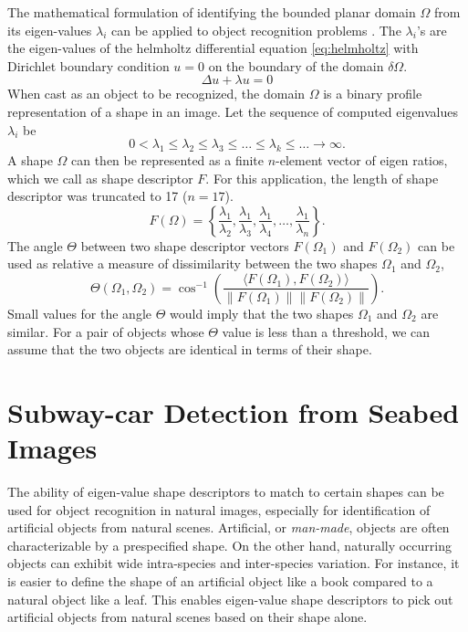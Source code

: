\documentclass {udthesis}
\begin{document}
The mathematical formulation of identifying the bounded planar domain $\Omega$ from its eigen-values $\lambda_{i}$ can be applied to object recognition problems \cite{khabou, zuliani}. The $\lambda_{i}$'s are the eigen-values of the helmholtz differential equation \eqref{eq:helmholtz} with Dirichlet boundary condition $u=0$ on the boundary of the domain $\delta\Omega$.
%
\begin{equation} \label{eq:helmholtz}
\Delta u+\lambda u = 0
\end{equation}
%
When cast as an object to be recognized, the domain $\Omega$ is a binary profile representation of a shape in an image.
Let the sequence of computed eigenvalues $\lambda_i$ be
%
\begin{equation} \label{eq:eigenvalue}
0<\lambda_{1}\leq\lambda_{2}\leq\lambda_{3}\leq\dots\leq\lambda_{k}\leq\dots\rightarrow\infty.
\end{equation}
%
A shape $\Omega$ can then be represented as a finite $n$-element vector of eigen ratios, which we call as shape descriptor $F$. For this application, the length of shape descriptor was truncated to 17 ($n=17$).
%
\begin{equation} \label{eq:eigenratio}
F(\Omega) = \left\{\frac{\lambda_{1}}{\lambda_{2}},\frac{\lambda_{1}}{\lambda_{3}},\frac{\lambda_{1}}{\lambda_{4}},\dots,\frac{\lambda_{1}}{\lambda_{n}}\right\}.
\end{equation}
%
The angle $\Theta$ between two shape descriptor vectors $F(\Omega_{1})$ and $F(\Omega_{2})$ can be used as relative a measure of dissimilarity between the two shapes $\Omega_{1}$ and $\Omega_{2}$,
%
\begin{equation} \label{eq:eigendist}
\Theta\left(\Omega_{1},\Omega_{2}\right)=\cos^{-1}\left(\frac{\langle F(\Omega_{1}),F(\Omega_{2})\rangle}{\|F(\Omega_{1})\|\|F(\Omega_{2})\|}\right).
\end{equation}
%
Small values for the angle $\Theta$  would imply that the two shapes $\Omega_{1}$ and $\Omega_{2}$ are similar.
For a pair of objects whose $\Theta$ value is less than a threshold, 
we can assume that the two objects are identical in terms of their shape.


\section{Subway-car Detection from Seabed Images} \label{sec:subwaycar_results}


The ability of eigen-value shape descriptors to match to certain shapes can be used for object recognition in natural images, especially for identification of artificial objects from natural scenes. Artificial, or \textit{man-made}, objects are often characterizable by a prespecified shape. On the other hand, naturally occurring objects can exhibit wide intra-species and inter-species variation. For instance, it is easier to define the shape of an artificial object like a book compared to a natural object like a leaf. This enables eigen-value shape descriptors to pick out artificial objects from natural scenes based on their shape alone.
\end{document}
